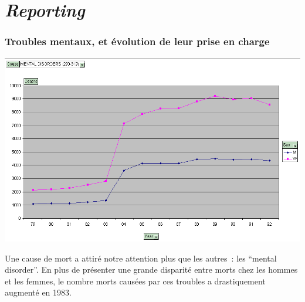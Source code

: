 \chapter{\textit{Reporting}}







\subsection{Troubles mentaux, et évolution de leur prise en charge}

    \includegraphics[scale=0.5]{images/mental_disorder.png}

    Une cause de mort a attiré notre attention plus que les autres~: les ``mental disorder''. En plus de présenter une grande disparité
    entre morts chez les hommes et les femmes, le nombre morts causées par ces troubles a drastiquement augmenté en 1983.

